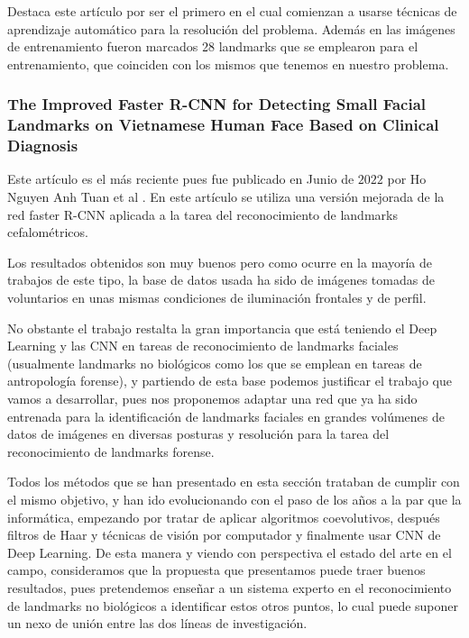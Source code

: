                 \medskip

                \noindent Destaca este artículo por ser el primero en el cual comienzan a usarse técnicas de aprendizaje automático para la resolución del problema. Además en las imágenes de entrenamiento fueron marcados 28 landmarks que se emplearon para el entrenamiento, que coinciden con los mismos que tenemos en nuestro problema.

            \subsubsection{The Improved Faster R-CNN for Detecting Small Facial Landmarks on Vietnamese Human Face Based on Clinical Diagnosis}
            
                \noindent Este artículo es el más reciente pues fue publicado en Junio de $2022$ por Ho Nguyen Anh Tuan et al \cite{ImprovedfasterRCNN}. En este artículo se utiliza una versión mejorada de la red faster R-CNN aplicada a la tarea del reconocimiento de landmarks cefalométricos. 

                \medskip

                \noindent Los resultados obtenidos son muy buenos pero como ocurre en la mayoría de trabajos de este tipo, la base de datos usada ha sido de imágenes tomadas de voluntarios en unas mismas condiciones de iluminación frontales y de perfil. 

                \medskip

                \noindent No obstante el trabajo restalta la gran importancia que está teniendo el Deep Learning y las CNN en tareas de reconocimiento de landmarks faciales (usualmente landmarks no biológicos como los que se emplean en tareas de antropología forense), y partiendo de esta base podemos justificar el trabajo que vamos a desarrollar, pues nos proponemos adaptar una red que ya ha sido entrenada para la identificación de landmarks faciales en grandes volúmenes de datos de imágenes en diversas posturas y resolución para la tarea del reconocimiento de landmarks forense.

                \medskip

                \noindent Todos los métodos que se han presentado en esta sección trataban de cumplir con el mismo objetivo, y han ido evolucionando con el paso de los años a la par que la informática, empezando por tratar de aplicar algoritmos coevolutivos, después filtros de Haar y técnicas de visión por computador y finalmente usar CNN de Deep Learning. De esta manera y viendo con perspectiva el estado del arte en el campo, consideramos que la propuesta que presentamos puede traer buenos resultados, pues pretendemos enseñar a un sistema experto en el reconocimiento de landmarks no biológicos a identificar estos otros puntos, lo cual puede suponer un nexo de unión entre las dos líneas de investigación.

